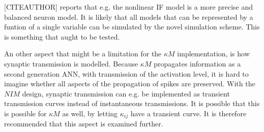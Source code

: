 
		[CITEAUTHOR] reports that e.g. the nonlinear IF model is a more precise and balanced neuron model\cite{CITE}.
		It is likely that all models that can be represented by a funtion of a single variable can be simulated by the novel simulation scheme. %
		This is something that aught to be tested.		


		An other aspect that might be a limitation for the $\kappa M$ implementation, is how synaptic transmission is modelled.
		Because $\kappa M$ propagates information as a second generation ANN, with transmission of the activation level, 
			it is hard to imagine whether all aspects of the propagation of spikes are preserved.
		With the $NIM$ design, synaptic transmission can e.g. be implemented as transient transmission curves instead of instantaneous transmissions.
		It is possible that this is possible for $\kappa M$ as well, by letting $\kappa_{ij}$ have a transient curve.
		It is therefore recommended that this aspect is examined further.


